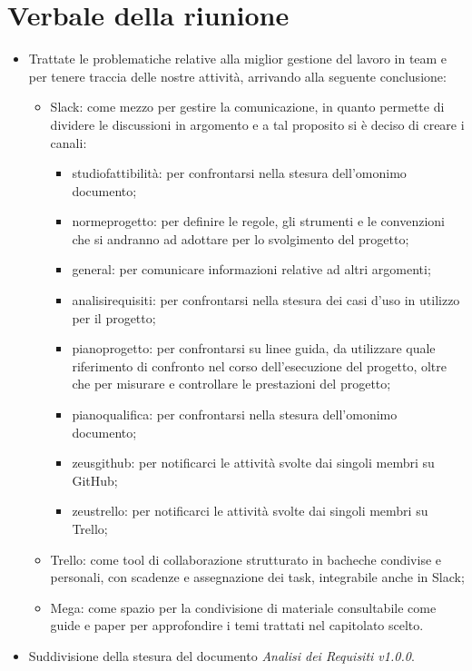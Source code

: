 \section{Verbale della riunione}
\begin{itemize}
	\item Trattate le problematiche relative alla miglior gestione del lavoro in team e per tenere traccia delle nostre attività, arrivando alla seguente conclusione:
	\begin{itemize}
		\item Slack: come mezzo per gestire la comunicazione, in quanto permette di dividere le discussioni in argomento e a tal proposito si è deciso di creare i canali:
		\begin{itemize}
			\item studiofattibilità: per confrontarsi nella stesura dell'omonimo documento;
			\item normeprogetto: per definire le regole, gli strumenti e le convenzioni che si andranno ad adottare per lo svolgimento del progetto;
			\item general: per comunicare informazioni relative ad altri argomenti;
			\item analisirequisiti: per confrontarsi nella stesura dei casi d'uso in utilizzo per il progetto;
			\item pianoprogetto: per confrontarsi su linee guida, da utilizzare quale riferimento di confronto nel corso dell’esecuzione del progetto, oltre che per misurare e controllare le prestazioni del progetto;
			\item pianoqualifica: per confrontarsi nella stesura dell'omonimo documento;
			\item zeusgithub: per notificarci le attività svolte dai singoli membri su GitHub;
			\item zeustrello: per notificarci le attività svolte dai singoli membri su Trello;
		\end{itemize}  
		\item Trello: come tool di collaborazione strutturato in bacheche condivise e personali, con scadenze e assegnazione dei task, integrabile anche in Slack;
		\item Mega: come spazio per la condivisione di materiale consultabile come guide e paper per approfondire i temi trattati nel capitolato scelto.
	\end{itemize}
	\item Suddivisione della stesura del documento \textit{Analisi dei Requisiti v1.0.0}. 
\end{itemize} 
\pagebreak

